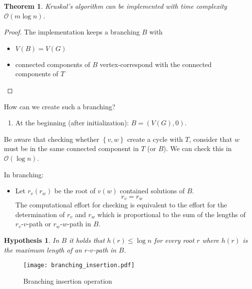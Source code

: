 \documentclass{article}
\newtheorem{theorem}{Theorem}
\newtheorem*{hypothesis}{Hypothesis}
\newcommand{\set}[1]{\left\{#1\right\}}
\newcommand{\gath}[2]{$#1$-$#2$-path} %
\begin{document}
\begin{theorem}\label{satz-2.5}
  Kruskal's algorithm can be implemented with time complexity $\mathcal{O}(m \log{n})$.
\end{theorem}

\begin{proof}
  The implementation keeps a branching $B$ with
  \begin{itemize}
    \item $V(B) = V(G)$
    \item connected components of $B$ vertex-correspond with the connected components of $T$
  \end{itemize}
\end{proof}

How can we create such a branching?
\begin{enumerate}
  \item At the beginning (after initialization): $B = (V(G), 0)$.
\end{enumerate}

Be aware that checking whether $\set{v, w}$ create a cycle with $T$, consider that $w$ must be in the same connected component in $T$ (or $B$).
We can check this in $\mathcal{O}(\log{n})$.

In branching:
\begin{itemize}
  \item Let $r_v(r_w)$ be the root of $v(w)$ contained solutions of $B$.
    \[
      r_v = r_w
    \]
    The computational effort for checking is equivalent to the effort for the determination of $r_v$ and $r_w$
    which is proportional to the sum of the lengths of \gath{r_v}{v} or \gath{r_w}{w} in $B$.
\end{itemize}

\begin{hypothesis}
  In $B$ it holds that $h(r) \leq \log{n}$ for every root $r$ where $h(r)$ is the maximum length of an \gath rv in $B$.
\end{hypothesis}

\begin{figure}[h]
  \begin{center}
    \texttt{[image: branching\_insertion.pdf]}
    \caption{Branching insertion operation}
  \end{center}
\end{figure}
\end{document}
